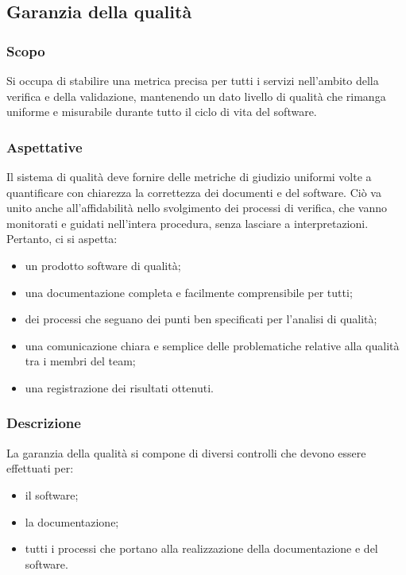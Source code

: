 \subsection{Garanzia della qualità}

	\subsubsection{Scopo}

		Si occupa di stabilire una metrica precisa per tutti i servizi nell'ambito della verifica e della validazione, mantenendo un dato livello di qualità che rimanga uniforme e misurabile durante tutto il ciclo di vita del software.

	\subsubsection{Aspettative}

		Il sistema di qualità deve fornire delle metriche di giudizio uniformi volte a quantificare con chiarezza la correttezza dei documenti e del software. Ciò va unito anche all'affidabilità nello svolgimento dei processi di verifica, che vanno monitorati e guidati nell'intera procedura, senza lasciare a interpretazioni. Pertanto, ci si aspetta:
		\begin{itemize}
			\item un prodotto software di qualità;
			\item una documentazione completa e facilmente comprensibile per tutti;
			\item dei processi che seguano dei punti ben specificati per l'analisi di qualità;
			\item una comunicazione chiara e semplice delle problematiche relative alla qualità tra i membri del team;
			\item una registrazione dei risultati ottenuti.
		\end{itemize}

	\subsubsection{Descrizione}

		La garanzia della qualità si compone di diversi controlli che devono essere effettuati per:
		\begin{itemize}
			\item il software;
			\item la documentazione;
			\item tutti i processi che portano alla realizzazione della documentazione e del software.
		\end{itemize}

